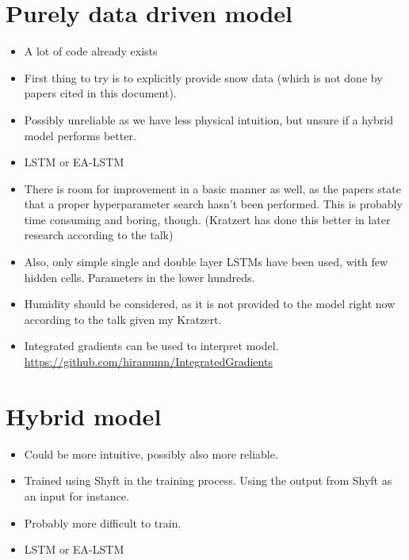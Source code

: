 \documentclass[a4paper,12pt,english]{article}
\begin{document}
\section*{Purely data driven model}
\begin{itemize}
\item A lot of code already exists
\item First thing to try is to explicitly provide snow data (which is not done by papers cited in this document).
\item Possibly unreliable as we have less physical intuition, but unsure if a hybrid model performs better.
\item LSTM or EA-LSTM
\item There is room for improvement in a basic manner as well, as the papers state that a proper hyperparameter search hasn't been performed. This is probably time consuming and boring, though. (Kratzert has done this better in later research according to the talk)
\item Also, only simple single and double layer LSTMs have been used, with few hidden cells. Parameters in the lower hundreds.
\item Humidity should be considered, as it is not provided to the model right now according to the talk given my Kratzert.
\item Integrated gradients can be used to interpret model. \url{https://github.com/hiranumn/IntegratedGradients}
\end{itemize}

\section*{Hybrid model}
\begin{itemize}
\item Could be more intuitive, possibly also more reliable.
\item Trained using Shyft in the training process. Using the output from Shyft as an input for instance.
\item Probably more difficult to train.
\item LSTM or EA-LSTM
\end{itemize}
\end{document}
